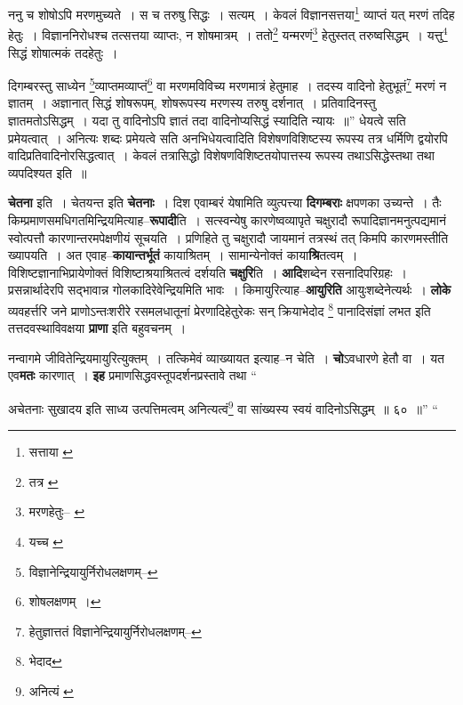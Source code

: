 \documentclass[article,12pt,a4paper]{memoir}
\begin{document}
	ननु च शोषोऽपि मरणमुच्यते । स च तरुषु सिद्धः । सत्यम् । केवलं विज्ञानसत्तया\footnote{सत्ताया \cite{dp-msA}} व्याप्तं यत् मरणं तदिह हेतुः । विज्ञाननिरोधश्च तत्सत्तया व्याप्तः, न शोषमात्रम् । ततो\footnote{तत्र \cite{dp-msA}} यन्मरणं\footnote{मरणहेतुः--\cite{dp-msA} \cite{dp-msB} \cite{dp-edP} \cite{dp-edH} \cite{dp-edN}} हेतुस्तत् तरुष्वसिद्धम् । यत्तु\footnote{यच्च \cite{dp-msD}} सिद्धं शोषात्मकं तदहेतुः । 
	  
	दिगम्बरस्तु साध्येन \footnote{विज्ञानेन्द्रियायुर्निरोधलक्षणम्--\cite{dp-msD-n}}\-व्याप्तमव्याप्तं\footnote{शोषलक्षणम् ।} वा मरणमविविच्य मरणमात्रं हेतुमाह । तदस्य वादिनो हेतुभूतं\footnote{हेतुज्ञात्ततं \cite{dp-msA} विज्ञानेन्द्रियायुर्निरोधलक्षणम्--\cite{dp-msD-n}} मरणं न ज्ञातम् । अज्ञानात् सिद्धं शोषरूपम्, शोषरूपस्य मरणस्य तरुषु दर्शनात् । प्रतिवादिनस्तु ज्ञातमतोऽसिद्धम् । यदा तु वादिनोऽपि ज्ञातं तदा वादिनोप्यसिद्धं स्यादिति न्यायः ॥” धेयत्वे सति प्रमेयत्वात् । अनित्यः शब्दः प्रमेयत्वे सति अनभिधेयत्वादिति विशेषणविशिष्टस्य रूपस्य तत्र धर्मिणि द्वयोरपि वादिप्रतिवादिनोरसिद्धत्वात् । केवलं तत्रासिद्धो विशेषणविशिष्टतयोपात्तस्य रूपस्य तथाऽसिद्धेस्तथा तथा व्यपदिश्यत इति ॥
	\pend
      

	  \pstart \textbf{चेतना} इति । चेतयन्त इति \textbf{चेतनाः} । दिश एवाम्बरं येषामिति व्युत्पत्त्या \textbf{दिगम्बराः} क्षपणका उच्यन्ते । तैः किम्प्रमाणसमधिगतमिन्द्रियमित्याह--\textbf{रूपादी}ति । सत्स्वन्येषु कारणेष्वव्यापृते चक्षुरादौ रूपादिज्ञानमनुत्पद्यमानं स्वोत्पत्तौ कारणा\leavevmode{}न्तरमपेक्षणीयं सूचयति । प्रणिहिते तु चक्षुरादौ जायमानं तत्रस्थं तत् किमपि कारणमस्तीति ख्यापयति । अत एवाह--\textbf{कायान्तर्भूतं} कायाश्रितम् । सामान्येनोक्तं काया\textbf{श्रि}तत्वम् । विशिष्टज्ञानाभिप्रायेणोक्तं विशिष्टाश्रयाश्रितत्वं दर्शयति \textbf{चक्षुरि}ति । \textbf{आदि}शब्देन रसनादिपरिग्रहः । प्रसन्नार्थादेरपि सद्भावान्न गोलकादिरेवेन्द्रियमिति भावः । किमायुरित्याह--\textbf{आयुरिति} आयुःशब्देनेत्यर्थः । \textbf{लोके} व्यवहर्त्तरि जने प्राणोऽन्तःशरीरे रसमलधातूनां प्रेरणादिहेतुरेकः सन् क्रियाभेदोद \footnote{भेदाद} पानादिसंज्ञां लभत इति तत्तदवस्थाविवक्षया \textbf{प्राणा} इति बहुवचनम् ।
	\pend
      

	  \pstart नन्वागमे जीवितेन्द्रियमायुरित्युक्तम् । तत्किमेवं व्याख्यायत इत्याह--न चेति । \textbf{चो}ऽवधारणे हेतौ वा । यत एव\textbf{मतः} कारणात् । \textbf{इह} प्रमाणसिद्धवस्तूपदर्शनप्रस्तावे तथा  \leavevmode{} “
	  
	अचेतनाः सुखादय इति साध्य उत्पत्तिमत्वम् अनित्यत्वं\footnote{अनित्यं \cite{dp-msB} \cite{dp-edP} \cite{dp-edH} \cite{dp-edE} \cite{dp-edN}} वा सांख्यस्य स्वयं वादिनोऽसिद्धम् ॥ ६० ॥” “
	  
\end{document}
